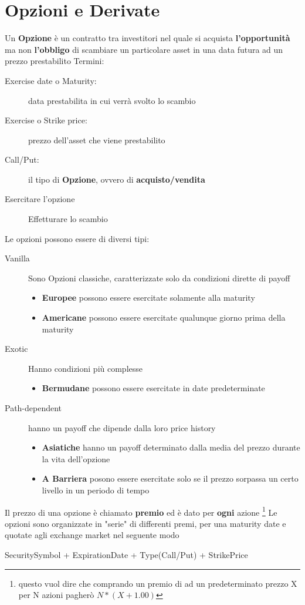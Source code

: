 \documentclass[a4paper,11pt]{report}
\begin{document}
{\section{Opzioni e Derivate}
	Un \textbf{Opzione} è un contratto tra investitori nel quale si acquista \textbf{l'opportunità} ma non \textbf{l'obbligo} 
	di scambiare un particolare asset in una data futura ad un prezzo prestabilito \newline
	Termini: \newline
\begin{description}
	\item[Exercise date o Maturity:] data prestabilita in cui verrà svolto lo scambio 
	\item[Exercise o Strike price:] prezzo dell'asset che viene prestabilito
	\item[Call/Put:] il tipo di \textbf{Opzione}, ovvero di \textbf{acquisto/vendita}
	\item[Esercitare l'opzione] Effetturare lo scambio
\end{description} 
	Le opzioni possono essere di diversi tipi:
\begin{description}
	\item[Vanilla] Sono Opzioni classiche, caratterizzate solo da condizioni dirette di payoff
		\begin{itemize}
			\item \textbf{Europee} possono essere esercitate solamente alla maturity
			\item \textbf{Americane} possono essere esercitate qualunque giorno prima della maturity
		\end{itemize}
	\item[Exotic] Hanno condizioni più complesse
		\begin{itemize}
			\item \textbf{Bermudane} possono essere esercitate in date predeterminate
		\end{itemize}
	\item[Path-dependent] hanno un payoff che dipende dalla loro price history
		\begin{itemize}
			\item \textbf{Asiatiche} hanno un payoff determinato dalla media del prezzo durante la vita dell'opzione
			\item \textbf{A Barriera} posono essere esercitate solo se il prezzo sorpassa un certo livello in un periodo di tempo
		\end{itemize}
\end{description}
	Il prezzo di una opzione è chiamato \textbf{premio} ed è dato per \textbf{ogni} azione
	 \footnote{questo vuol dire che comprando un premio di   ad un predeterminato prezzo X per N azioni pagherò $N*(X+1.00)$}
	\newline  Le opzioni sono organizzate in "serie" di differenti premi, per una maturity date e quotate agli exchange market nel 		seguente modo \newline
\begin{center}
	SecuritySymbol + ExpirationDate + Type(Call/Put) + StrikePrice
\end{center}
}
\end{document}
